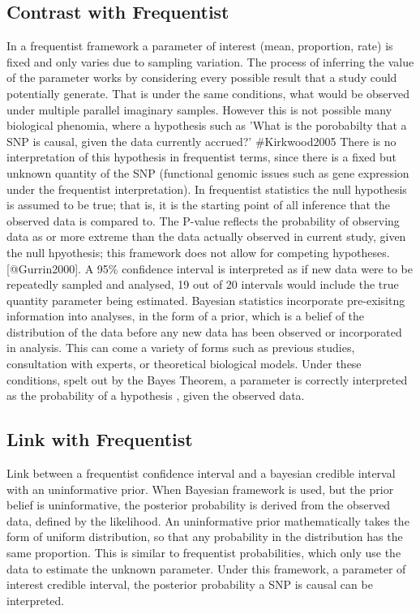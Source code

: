 \subsection{Contrast with Frequentist}
In a frequentist framework a parameter of interest (mean, proportion, rate)  is fixed and only varies due to sampling variation. The process of inferring the value of the parameter works by considering every possible result that a study could potentially generate. That is under the same conditions, what would be observed under multiple parallel imaginary samples. However this is not possible many biological phenomia, where a hypothesis such as 'What is the porobabilty that a SNP is causal, given the data currently accrued?' #Kirkwood2005 There is no interpretation of this hypothesis in frequentist terms, since there is a fixed but unknown quantity of the SNP (functional genomic issues such as gene expression under the frequentist interpretation).  In frequentist statistics the null hypothesis is assumed to be true; that is, it is the starting point of all inference that the observed data is compared to. The P-value reflects the probability of observing data as or more extreme than the data actually observed in current study, given the null hpyothesis; this framework does not allow for competing hypotheses. [@Gurrin2000]. A 95\% confidence interval is interpreted as if new data were to be repeatedly sampled and analysed, 19 out of 20 intervals would include the true quantity parameter being estimated. 
Bayesian statistics incorporate pre-exisitng information into analyses, in the form of a prior, which is a belief of the distribution of the data before any new data has been observed or incorporated in analysis. This can come a variety of forms such as previous studies, consultation with experts, or theoretical biological models. Under these conditions, spelt out by the Bayes Theorem, a parameter is correctly interpreted as the probability of a hypothesis , given the observed data. 

\subsection{Link with Frequentist}
Link between a frequentist confidence interval and a bayesian credible interval with an uninformative prior. When Bayesian framework is used, but the prior belief is uninformative, the posterior probability is derived from the observed data, defined by the likelihood. An uninformative prior mathematically takes the form of uniform distribution, so that any probability in the distribution has the same proportion. This is similar to frequentist probabilities, which only use the data to estimate the unknown parameter. Under this framework, a parameter of interest credible interval, the posterior probability a SNP is causal can be interpreted. 


